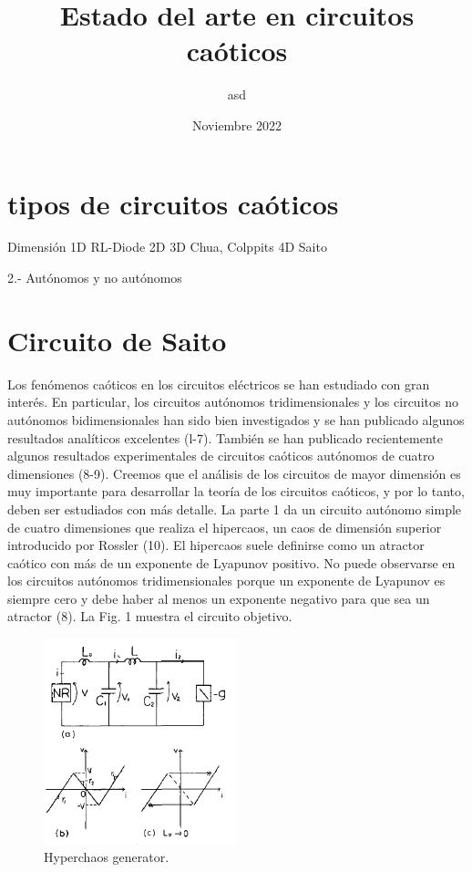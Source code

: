 \documentclass{article}
\title{Estado del arte en circuitos caóticos}
\author{asd}
\date{Noviembre 2022}
\begin{document}
\maketitle
\section{tipos de circuitos caóticos}
Dimensión 
1D RL-Diode
2D
3D Chua, Colppits
4D Saito

2.- Autónomos y no autónomos
\section{Circuito de Saito}

    Los fenómenos caóticos en los circuitos eléctricos se han estudiado con gran interés. En particular, los circuitos autónomos tridimensionales y los circuitos no autónomos bidimensionales han sido bien investigados y se han publicado algunos resultados analíticos excelentes (l-7). También se han publicado recientemente algunos resultados experimentales de circuitos caóticos autónomos de cuatro dimensiones (8-9). Creemos que el análisis de los circuitos de mayor dimensión es muy importante para desarrollar la teoría de los circuitos caóticos, y por lo tanto, deben ser estudiados con más detalle. La parte 1 da un circuito autónomo simple de cuatro dimensiones que realiza el hipercaos, un caos de dimensión superior introducido por Rossler (10). El hipercaos suele definirse como un atractor caótico con más de un exponente de Lyapunov positivo. No puede observarse en los circuitos autónomos tridimensionales porque un exponente de Lyapunov es siempre cero y debe haber al menos un exponente negativo para que sea un atractor (8). La Fig. 1 muestra el circuito objetivo. 
    \begin{figure}[h]
        \centering
        \includegraphics[width=0.5\textwidth]{Saito/fig. 1 Saito.png}
        \caption{Hyperchaos generator.}
        \label{fig1:saito}
    \end{figure}
\end{document}
